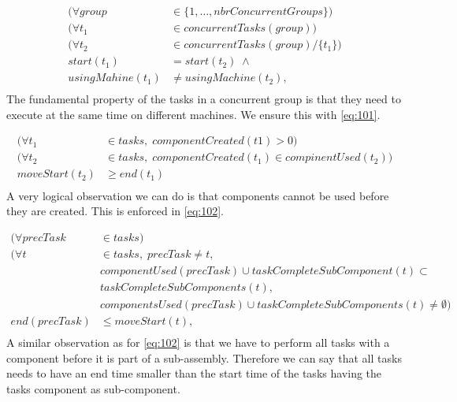  \begin{equation}
 \begin{aligned}\label{eq:101}
 (\forall group &\in \{1 , \ldots , nbrConcurrentGroups\}) \\
 (\forall t_1 &\in concurrentTasks(group)) \\
 (\forall t_2 &\in concurrentTasks(group) / \{t_1\}) \\
 start(t_1) &= start(t_2) \; \land \\
 usingMahine(t_1) &\neq usingMachine(t_2), \\
 \end{aligned}
 \end{equation}
 The fundamental property of the tasks in a concurrent group is that they need to execute at the same time on different machines. We ensure this with \ref{eq:101}.
 
 \begin{equation}
 \begin{aligned}\label{eq:102}
 (\forall t_1 &\in tasks, \; componentCreated(t1) > 0) \\
 (\forall t_2 &\in tasks, \; componentCreated(t_1) \in compinentUsed(t_2)) \\
 moveStart(t_2) &\geq end(t_1) \\
 \end{aligned}
 \end{equation}
 A very logical observation we can do is that components cannot be used before they are created. This is enforced in \ref{eq:102}.
 
 \begin{equation}
 \begin{aligned}\label{eq:103}
 (\forall precTask &\in tasks) \\
 (\forall t &\in tasks, \; precTask \neq t,\\
 &componentUsed(precTask) \cup taskCompleteSubComponent(t) \subset\\
 &taskCompleteSubComponents(t),\\
 &componentsUsed(precTask) \cup taskCompleteSubComponents(t) \neq \emptyset)\\
 end(precTask) &\leq moveStart(t), \\
 \end{aligned}
 \end{equation}
 A similar observation as for \ref{eq:102} is that we have to perform all tasks with a component before it is part of a sub-assembly. Therefore we can say that all tasks needs to have an end time smaller than the start time of the tasks having the tasks component as sub-component.
 
